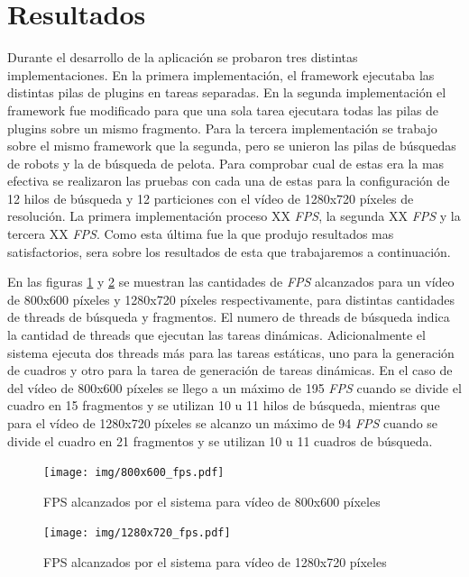 \section{Resultados}

Durante el desarrollo de la aplicación se probaron tres distintas
implementaciones. En la primera implementación, el framework ejecutaba las
distintas pilas de plugins en tareas separadas. En la segunda implementación el
framework fue modificado para que una sola tarea ejecutara todas las pilas de
plugins sobre un mismo fragmento. Para la tercera implementación se trabajo
sobre el mismo framework que la segunda, pero se unieron las pilas de búsquedas
de robots y la de búsqueda de pelota. Para comprobar cual de estas era la mas
efectiva se realizaron las pruebas con cada una de estas para la configuración
de 12 hilos de búsqueda y 12 particiones con el vídeo de 1280x720 píxeles de
resolución. La primera implementación proceso XX \emph{FPS}, la segunda XX
\emph{FPS} y la tercera XX \emph{FPS}. Como esta última fue la que produjo
resultados mas satisfactorios, sera sobre los resultados de esta que
trabajaremos a continuación.

En las figuras \ref{800fps} y \ref{1280fps} se muestran las cantidades de
\emph{FPS} alcanzados para un vídeo de 800x600 píxeles y 1280x720 píxeles
respectivamente, para distintas cantidades de threads de búsqueda y fragmentos.
El numero de threads de búsqueda indica la cantidad de threads que ejecutan las
tareas dinámicas. Adicionalmente el sistema ejecuta dos threads más para las
tareas estáticas, uno para la generación de cuadros y otro para la tarea de
generación de tareas dinámicas. En el caso de del vídeo de 800x600 píxeles se
llego a un máximo de 195 \emph{FPS} cuando se divide el cuadro en 15 fragmentos
y se utilizan 10 u 11 hilos de búsqueda, mientras que para el vídeo de 1280x720
píxeles se alcanzo un máximo de 94 \emph{FPS} cuando se divide el cuadro en 21
fragmentos y se utilizan 10 u 11 cuadros de búsqueda.

\begin{figure}[!h]

	\texttt{[image: img/800x600\_fps.pdf]}
	\caption{FPS alcanzados por el sistema para vídeo de 800x600 píxeles}
	\label{800fps}

\end{figure}

\begin{figure}[!h]

	\texttt{[image: img/1280x720\_fps.pdf]}
	\caption{FPS alcanzados por el sistema para vídeo de 1280x720 píxeles}
	\label{1280fps}

\end{figure}

